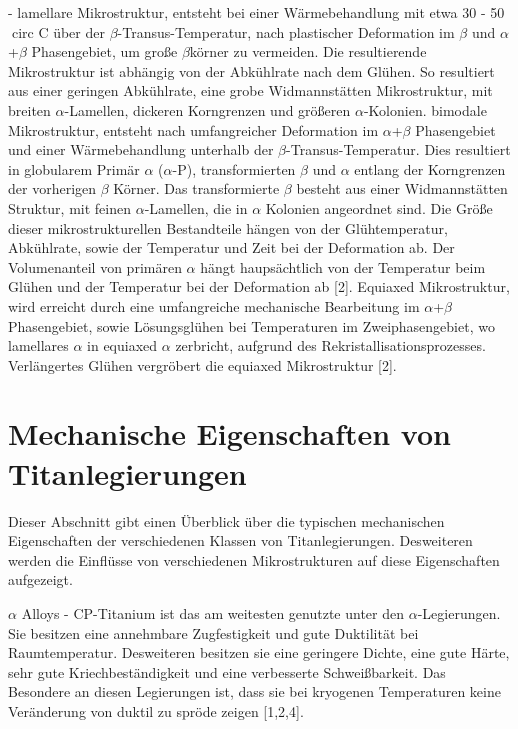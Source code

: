 - lamellare Mikrostruktur, entsteht bei einer Wärmebehandlung mit etwa 30 - 50 ^^\circ C über der $\beta$-Transus-Temperatur, nach plastischer Deformation im $\beta$ und $\alpha$+$\beta$ Phasengebiet, um große $\beta$körner zu vermeiden. Die resultierende Mikrostruktur ist abhängig von der Abkühlrate nach dem Glühen. So resultiert aus einer geringen Abkühlrate, eine grobe Widmannstätten Mikrostruktur, mit breiten $\alpha$-Lamellen, dickeren Korngrenzen und größeren $\alpha$-Kolonien.
bimodale Mikrostruktur, entsteht nach umfangreicher Deformation im $\alpha$+$\beta$ Phasengebiet und einer Wärmebehandlung unterhalb der $\beta$-Transus-Temperatur. Dies resultiert in globularem Primär $\alpha$ ($\alpha$-P), transformierten $\beta$ und $\alpha$ entlang der Korngrenzen der vorherigen $\beta$ Körner. Das transformierte $\beta$ besteht aus einer Widmannstätten Struktur, mit feinen $\alpha$-Lamellen, die in $\alpha$ Kolonien angeordnet sind. Die Größe dieser mikrostrukturellen Bestandteile hängen von der Glühtemperatur, Abkühlrate, sowie der Temperatur und Zeit bei der Deformation ab. Der Volumenanteil von primären $\alpha$ hängt haupsächtlich von der Temperatur beim Glühen und der Temperatur bei der Deformation ab [2].
Equiaxed Mikrostruktur, wird erreicht durch eine umfangreiche mechanische Bearbeitung im $\alpha$+$\beta$ Phasengebiet, sowie Lösungsglühen bei Temperaturen im Zweiphasengebiet, wo lamellares $\alpha$ in equiaxed $\alpha$ zerbricht, aufgrund des Rekristallisationsprozesses. Verlängertes Glühen vergröbert die equiaxed Mikrostruktur [2].



\section{Mechanische Eigenschaften von Titanlegierungen}

Dieser Abschnitt gibt einen Überblick über die typischen mechanischen Eigenschaften der verschiedenen Klassen von Titanlegierungen. Desweiteren werden die Einflüsse von verschiedenen Mikrostrukturen auf diese Eigenschaften aufgezeigt.

$\alpha$ Alloys - CP-Titanium ist das am weitesten genutzte unter den $\alpha$-Legierungen. Sie besitzen eine annehmbare Zugfestigkeit und gute Duktilität bei Raumtemperatur. Desweiteren besitzen sie eine geringere Dichte, eine gute Härte, sehr gute Kriechbeständigkeit und eine verbesserte Schweißbarkeit. Das Besondere an diesen Legierungen ist, dass sie bei kryogenen Temperaturen keine Veränderung von duktil zu spröde zeigen [1,2,4].

